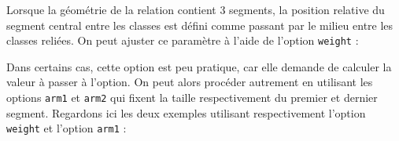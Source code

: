 \documentclass[a4paper,11pt]{report}
\newcommand{\inputTikZ}[1]{%
  }%
\newcommand{\inputTikZ}[1]{%
    \texttt{[image: fig/\#1.pdf]}%
  }%
\begin{document}
\medskip

\begin{minipage}{0.5\textwidth}

\end{minipage}
\begin{minipage}{0.4\textwidth}
\begin{center}
\inputTikZ{relationCN}
\end{center}
\end{minipage}

\medskip

Lorsque la géométrie de la relation contient 3 segments, la position relative du segment central entre les classes est défini comme passant par le milieu entre les classes reliées. On peut ajuster ce paramètre à l'aide de l'option \hypertarget{weight}{{\tt weight}} :

\medskip

\begin{minipage}{0.5\textwidth}

\end{minipage}
\begin{minipage}{0.4\textwidth}
\begin{center}
\inputTikZ{relationweight}
\end{center}
\end{minipage}

Dans certains cas, cette option est peu pratique, car elle demande de calculer la valeur à passer à l'option. On peut alors procéder autrement en utilisant les options \hypertarget{arm1}{{\tt arm1}} et \hypertarget{arm2}{{\tt arm2}} qui fixent la taille respectivement du premier et dernier segment. Regardons ici les deux exemples utilisant respectivement l'option {\tt weight} et l'option {\tt arm1} :

\medskip

\begin{minipage}{0.5\textwidth}

\end{minipage}
\begin{minipage}{0.4\textwidth}
\begin{center}
\inputTikZ{relationweight2}
\end{center}
\end{minipage}

\medskip

\begin{minipage}{0.5\textwidth}

\end{minipage}
\begin{minipage}{0.4\textwidth}
\begin{center}
\inputTikZ{relationarm}
\end{center}
\end{minipage}
\end{document}
